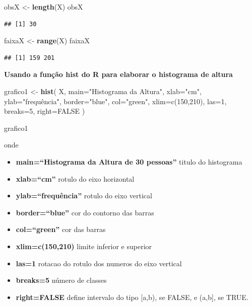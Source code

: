 \documentclass[
]{book}
\newenvironment{Shaded}{\begin{snugshade}}{\end{snugshade}}
\newcommand{\DataTypeTok}[1]{\textcolor[rgb]{0.13,0.29,0.53}{#1}}
\newcommand{\KeywordTok}[1]{\textcolor[rgb]{0.13,0.29,0.53}{\textbf{#1}}}
\newcommand{\NormalTok}[1]{#1}
\newcommand{\StringTok}[1]{\textcolor[rgb]{0.31,0.60,0.02}{#1}}
\providecommand{\tightlist}{%
  \setlength{\itemsep}{0pt}\setlength{\parskip}{0pt}}
\begin{document}
\begin{Shaded}
\begin{Highlighting}[]
\NormalTok{obsX <-}\StringTok{ }\KeywordTok{length}\NormalTok{(X)}
\NormalTok{obsX}
\end{Highlighting}
\end{Shaded}

\begin{verbatim}
## [1] 30
\end{verbatim}

\begin{Shaded}
\begin{Highlighting}[]
\NormalTok{faixaX <-}\StringTok{ }\KeywordTok{range}\NormalTok{(X)}
\NormalTok{faixaX}
\end{Highlighting}
\end{Shaded}

\begin{verbatim}
## [1] 159 201
\end{verbatim}

\textbf{Usando a função hist do R para elaborar o histograma de altura}

\begin{Shaded}
\begin{Highlighting}[]
\NormalTok{grafico1 <-}\StringTok{ }\KeywordTok{hist}\NormalTok{( }
\NormalTok{                  X, }
                  \DataTypeTok{main=}\StringTok{"Histograma da Altura"}\NormalTok{, }
                  \DataTypeTok{xlab=}\StringTok{"cm"}\NormalTok{, }
                  \DataTypeTok{ylab=}\StringTok{"frequência", }
\StringTok{                  border="}\NormalTok{blue}\StringTok{", }
\StringTok{                  col="}\NormalTok{green}\StringTok{", }
\StringTok{                  xlim=c(150,210), }
\StringTok{                  las=1, }
\StringTok{                  breaks=5, }
\StringTok{                  right=FALSE }
\StringTok{                ) }

\StringTok{grafico1}
\end{Highlighting}
\end{Shaded}

onde

\begin{itemize}
\tightlist
\item
  \textbf{main=``Histograma da Altura de 30 pessoas''} titulo do histograma
\item
  \textbf{xlab=``cm''} rotulo do eixo horizontal
\item
  \textbf{ylab=``frequência''} rotulo do eixo vertical
\item
  \textbf{border=``blue''} cor do contorno das barras
\item
  \textbf{col=``green''} cor das barras
\item
  \textbf{xlim=c(150,210)} limite inferior e superior
\item
  \textbf{las=1} rotacao do rotulo dos numeros do eixo vertical
\item
  \textbf{breaks=5} número de classes
\item
  \textbf{right=FALSE} define intervalo do tipo {[}a,b), se FALSE, e (a,b{]}, se TRUE.
\end{itemize}
\end{document}
